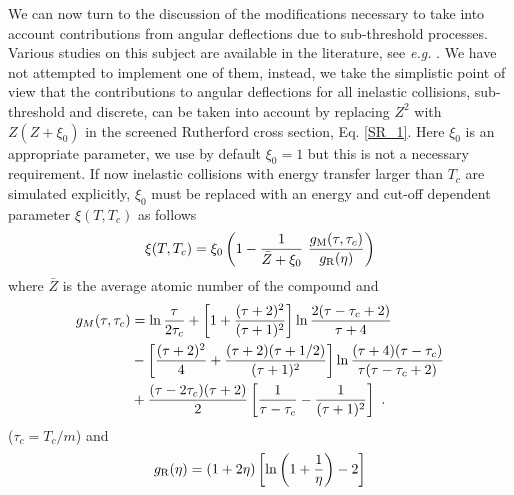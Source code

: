 We can now turn to the discussion of the modifications necessary 
to take into account contributions from angular deflections 
due to sub-threshold processes. Various studies on this subject 
are available in the literature, see {\em e.g.} \cite{Sc63,Fa54,BW89}. 
We have not attempted to implement one of them, instead, we 
take the simplistic point of view that the contributions  
to angular deflections for all inelastic collisions, sub-threshold 
and discrete, can be taken into account by replacing 
$Z^2$ with $Z (Z + \xi_{0})$ in the screened Rutherford 
cross section, Eq. \eqref{SR_1}. Here $\xi_0$ is an appropriate 
parameter, we use by default $\xi_0=1$ but this is not a necessary 
requirement. If now inelastic collisions with energy transfer 
larger than $T_c$ are simulated explicitly, $\xi_0$ must 
be replaced with an energy and cut-off dependent parameter $\xi(T,T_c)$ 
as follows \cite{Ka96c} 
\begin{equation}
\xi(T,T_c) = \xi_0 \left(1 - {1 \over \bar{Z} + \xi_0}~
{g_{\rm M}(\tau,\tau_c) \over g_{\rm R}(\eta) } \right)
\end{equation}
where $\bar{Z}$ is the average atomic number of the compound 
and %
\newcommand{\tpr}{\tau^{\prime}}
\begin{equation}
\begin{split}
g_M(\tau,\tau_c) & = 
\ln {\tau \over 2 \tau_c} + \left[1 + 
{(\tau + 2)^2 \over (\tau+1)^2} \right] \ln {2 (\tau-\tau_c+2) \over \tau + 4} 
\\ &- 
\left[{(\tau+2)^2 \over 4} + {(\tau+2) (\tau+1/2) \over (\tau+1)^2} \right] 
\ln {(\tau+4) (\tau-\tau_c) \over \tau (\tau-\tau_c+2)} \\ & + 
{(\tau-2 \tau_c) (\tau+2) \over 2} 
\left[{1 \over \tau-\tau_c} - {1 \over (\tau+1)^2} \right]~.
\end{split}
\end{equation}
($\tau_c = T_c/m$) and 
\begin{equation}
g_{\rm R}(\eta) = (1 + 2 \eta) \left[ \ln \left(1 + \frac{1}{\eta} \right) - 2
\right]
\end{equation}

